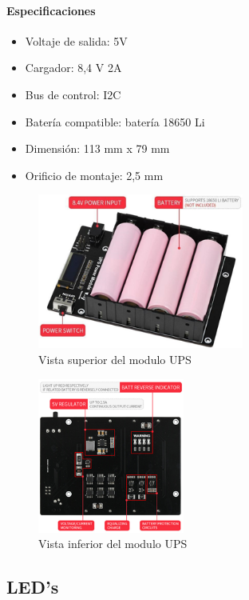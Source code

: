 \paragraph{Especificaciones}
\begin{itemize}
    \item Voltaje de salida: 5V
    \item Cargador: 8,4 V 2A
    \item Bus de control: I2C
    \item Batería compatible: batería 18650 Li
    \item Dimensión: 113 mm x 79 mm
    \item Orificio de montaje: 2,5 mm
\end{itemize}

\begin{figure}[H]
    \centering
    \includegraphics[height=2in]{images/ups_diagram_top.png}
    \captionsetup{font=footnotesize}
    \caption{Vista superior del modulo UPS}
    \label{fig:img5_4}
\end{figure}

\begin{figure}[H]
    \centering
    \includegraphics[height=2in]{images/ups_diagram_bottom.png}
    \captionsetup{font=footnotesize}
    \caption{Vista inferior del modulo UPS}
    \label{fig:img5_5}
\end{figure}


\subsection{LED's}
\label{subsection:subsubsec5_1_2}

